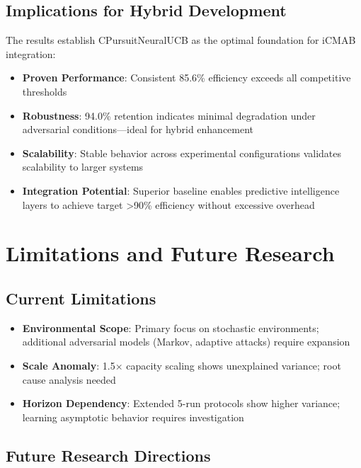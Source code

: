 \documentclass[12pt,a4paper]{article}
\newcommand{\primarytext}[1]{\textcolor{primaryblue}{\textbf{#1}}}
\newcommand{\success}[1]{\textcolor{accentgreen}{\textbf{#1}}}
\begin{document}
\subsection{Implications for Hybrid Development}

The results establish CPursuitNeuralUCB as the optimal foundation for iCMAB integration:

\begin{itemize}
\item \textbf{Proven Performance}: Consistent 85.6\% efficiency exceeds all competitive thresholds
\item \success{Robustness}: 94.0\% retention indicates minimal degradation under adversarial conditions—ideal for hybrid enhancement
\item \primarytext{Scalability}: Stable behavior across experimental configurations validates scalability to larger systems
\item \textbf{Integration Potential}: Superior baseline enables predictive intelligence layers to achieve target >90\% efficiency without excessive overhead
\end{itemize}

\section{Limitations and Future Research}

\subsection{Current Limitations}

\begin{itemize}
\item \textbf{Environmental Scope}: Primary focus on stochastic environments; additional adversarial models (Markov, adaptive attacks) require expansion
\item \textbf{Scale Anomaly}: 1.5× capacity scaling shows unexplained variance; root cause analysis needed
\item \textbf{Horizon Dependency}: Extended 5-run protocols show higher variance; learning asymptotic behavior requires investigation
\end{itemize}

\subsection{Future Research Directions}
\end{document}
